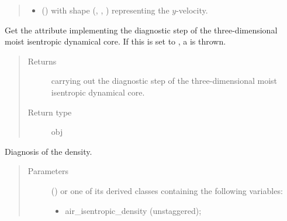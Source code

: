 \documentclass[letterpaper,10pt,english]{sphinxmanual}
\begin{document}
\begin{fulllineitems}
\begin{fulllineitems}
\begin{quote}
\begin{description}
\begin{itemize}
\item {} 
 () \textendash{}  with shape (, , ) representing the \(y\)-velocity.

\end{itemize}

\end{description}\end{quote}

\end{fulllineitems}


\begin{fulllineitems}
\label{\detokenize{api:dycore.diagnostic_isentropic.DiagnosticIsentropic.diagnostic}}
Get the attribute implementing the diagnostic step of the three-dimensional moist isentropic dynamical core.
If this is set to , a  is thrown.
\begin{quote}\begin{description}
\item[{Returns}] \leavevmode
{\hyperref[\detokenize{api:dycore.diagnostic_isentropic.DiagnosticIsentropic}]{}} carrying out the diagnostic step of the
three-dimensional moist isentropic dynamical core.

\item[{Return type}] \leavevmode
obj

\end{description}\end{quote}

\end{fulllineitems}


\begin{fulllineitems}
\label{\detokenize{api:dycore.diagnostic_isentropic.DiagnosticIsentropic.get_air_density}}
Diagnosis of the density.
\begin{quote}\begin{description}
\item[{Parameters}] \leavevmode
{} () \textendash{} 
{\hyperref[\detokenize{api:storages.grid_data.GridData}]{}} or one of its derived classes containing the following variables:
\begin{itemize}
\item {} 
air\_isentropic\_density (unstaggered);


\end{itemize}
\end{description}
\end{quote}
\end{fulllineitems}
\end{fulllineitems}
\end{document}
